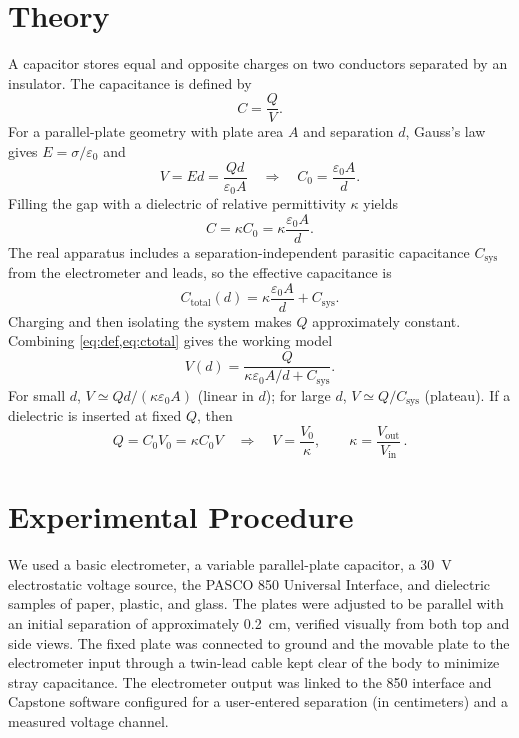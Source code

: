 \documentclass[12pt]{article}
\begin{document}
\section{Theory}
A capacitor stores equal and opposite charges on two conductors separated by an insulator.  The capacitance is defined by
\begin{equation}
    C=\frac{Q}{V}.
    \label{eq:def}
\end{equation}
For a parallel-plate geometry with plate area \(A\) and separation \(d\), Gauss’s law gives \(E=\sigma/\varepsilon_0\) and
\begin{equation}
    V=Ed=\frac{Qd}{\varepsilon_0A}\quad\Rightarrow\quad C_0=\frac{\varepsilon_0A}{d}.
    \label{eq:cpp_vac}
\end{equation}
Filling the gap with a dielectric of relative permittivity \(\kappa\) yields
\begin{equation}
    C=\kappa C_0=\kappa\frac{\varepsilon_0A}{d}.
    \label{eq:cpp_die}
\end{equation}
The real apparatus includes a separation-independent parasitic capacitance \(C_{\mathrm{sys}}\) from the electrometer and leads, so the effective capacitance is
\begin{equation}
    C_{\text{total}}(d)=\kappa\frac{\varepsilon_0A}{d}+C_{\mathrm{sys}}.
    \label{eq:ctotal}
\end{equation}
Charging and then isolating the system makes \(Q\) approximately constant. Combining \cref{eq:def,eq:ctotal} gives the working model
\begin{equation}
    V(d)=\frac{Q}{\kappa\varepsilon_0A/d+C_{\mathrm{sys}}}.
    \label{eq:vd_model}
\end{equation}
For small \(d\), \(V\simeq Qd/(\kappa\varepsilon_0A)\) (linear in \(d\)); for large \(d\), \(V\simeq Q/C_{\mathrm{sys}}\) (plateau). If a dielectric is inserted at fixed \(Q\), then
\begin{equation}
    Q=C_0V_0=\kappa C_0V\quad\Rightarrow\quad V=\frac{V_0}{\kappa},
    \qquad \kappa=\frac{V_{\text{out}}}{V_{\text{in}}}\,.
    \label{eq:ratio_kappa}
\end{equation}

\section{Experimental Procedure}
We used a basic electrometer, a variable parallel-plate capacitor, a \SI{30}{V} electrostatic voltage source, the PASCO 850 Universal Interface, and dielectric samples of paper, plastic, and glass.  The plates were adjusted to be parallel with an initial separation of approximately \SI{0.2}{cm}, verified visually from both top and side views.  The fixed plate was connected to ground and the movable plate to the electrometer input through a twin-lead cable kept clear of the body to minimize stray capacitance.  The electrometer output was linked to the 850 interface and Capstone software configured for a user-entered separation (in centimeters) and a measured voltage channel.
\end{document}
